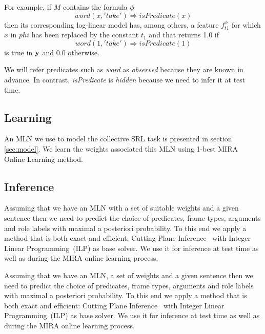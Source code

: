 For example, if $M$ contains the formula $\phi$ \[
word\left(x,'take'\right)\Rightarrow isPredicate\left(x\right)\]
then its corresponding log-linear model has, among others, a feature 
$f_{t1}^{\phi}$ for which $x$ in $phi$ has been replaced by the constant $t_1$ and that returns 1.0 if \[
word\left(1,'take'\right)\Rightarrow isPredicate\left(1\right)\]
is true in $\mathbf{y}$ and 0.0 otherwise.

We will refer predicates such as \emph{word} as \emph{observed} because they are known in advance. In contrast, \emph{isPredicate} is \emph{hidden} because we need to infer it at test time.

\subsection{Learning}

An MLN we use to model the collective SRL task is presented in section \ref{sec:model}. We learn the weights associated this MLN using 1-best MIRA~\citep{crammer01ultraconservative} Online Learning method. %

\subsection{Inference}

Assuming that we have an MLN with a set of suitable weights and a given sentence then we need to predict the choice of predicates, frame types, arguments and role labels with maximal a posteriori probability. To this end we apply a method that is both exact and efficient: Cutting Plane Inference~\citep[CPI,][]{riedel08improving} with Integer Linear Programming~(ILP) as base solver. We use it for inference at test time as well as during the MIRA online learning process.

Assuming that we have an MLN, a set of weights and a given sentence then we need to predict the choice of predicates, frame types, arguments and role labels with maximal a posteriori probability. To this end we apply a method that is both exact and efficient: Cutting Plane Inference~\citep[CPI,][]{riedel08improving} with Integer Linear Programming~(ILP) as base solver. We use it for inference at test time as well as during the MIRA online learning process.

